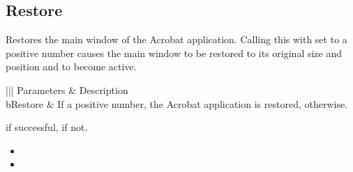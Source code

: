 \documentclass[letterpaper,12pt,english,openany,oneside]{sphinxmanual}
\begin{document}
\subsection{Restore}
\label{\detokenize{IAC_API_OLE_Objects:restore}}
Restores the main window of the Acrobat application. Calling this with  set to a positive number causes the main window to be restored to its original size and position and to become active.


\begin{sphinxVerbatim}[commandchars=\\\{\}]
  
\end{sphinxVerbatim}
\label{\detokenize{IAC_API_OLE_Objects:parameters-11}}


\begin{savenotes}\sphinxattablestart
\centering
{}\label{\detokenize{IAC_API_OLE_Objects:section-13}}\nobreak
\begin{tabular}[t]{|||}
\hline
\sphinxstyletheadfamily 
Parameters
&\sphinxstyletheadfamily 
Description
\\
\hline
bRestore
&
If a positive number, the Acrobat application is restored,  otherwise.
\\
\hline
\end{tabular}
\par
\sphinxattableend\end{savenotes}


 if successful,  if not.

\label{\detokenize{IAC_API_OLE_Objects:related-methods-18}}
\begin{itemize}
\item {} 
 

\item {} 
 

\end{itemize}
\end{document}
